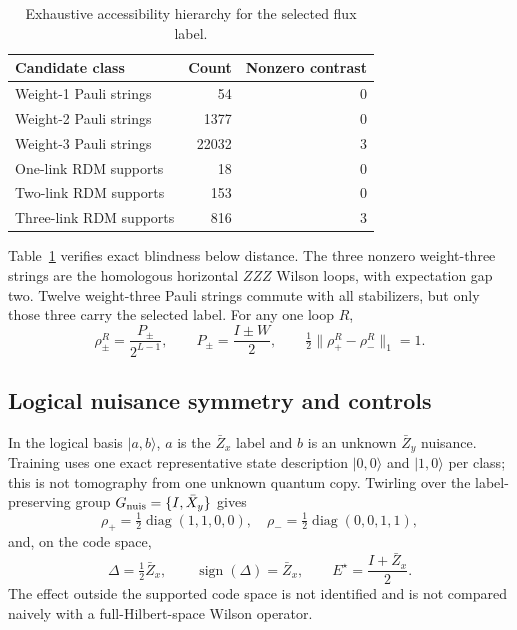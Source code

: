 \documentclass[letterpaper,journal]{IEEEtran}
\begin{document}
\begin{table}[t]
\centering
\caption{Exhaustive accessibility hierarchy for the selected flux label.}
\label{tab:access}
\begin{tabular}{lrr}
\toprule
Candidate class & Count & Nonzero contrast\\
\midrule
Weight-1 Pauli strings & 54 & 0\\
Weight-2 Pauli strings & 1377 & 0\\
Weight-3 Pauli strings & 22032 & 3\\
One-link RDM supports & 18 & 0\\
Two-link RDM supports & 153 & 0\\
Three-link RDM supports & 816 & 3\\
\bottomrule
\end{tabular}
\end{table}

Table~\ref{tab:access} verifies exact blindness below distance. The three
nonzero weight-three strings are the homologous horizontal $ZZZ$ Wilson loops,
with expectation gap two. Twelve weight-three Pauli strings commute with all
stabilizers, but only those three carry the selected label. For any one loop
$R$,
\begin{equation}
\rho_\pm^R=\frac{P_\pm}{2^{L-1}},\qquad
P_\pm=\frac{I\pm W}{2},\qquad
\tfrac12\|\rho_+^R-\rho_-^R\|_1=1.
\label{eq:looprdm}
\end{equation}

\subsection{Logical nuisance symmetry and controls}

In the logical basis $|a,b\rangle$, $a$ is the $\bar Z_x$ label and $b$ is an
unknown $\bar Z_y$ nuisance. Training uses one exact representative state
description $|0,0\rangle$ and $|1,0\rangle$ per class; this is not tomography
from one unknown quantum copy. Twirling over the label-preserving group
$G_{\rm nuis}=\{I,\bar X_y\}$ gives
\begin{equation}
\rho_+=\tfrac12\operatorname{diag}(1,1,0,0),\quad
\rho_-=\tfrac12\operatorname{diag}(0,0,1,1),
\label{eq:logicalstates}
\end{equation}
and, on the code space,
\begin{equation}
\Delta=\tfrac12\bar Z_x,\qquad
\operatorname{sign}(\Delta)=\bar Z_x,\qquad
E^\star=\frac{I+\bar Z_x}{2}.
\label{eq:logicaleffect}
\end{equation}
The effect outside the supported code space is not identified and is not
compared naively with a full-Hilbert-space Wilson operator.
\end{document}
